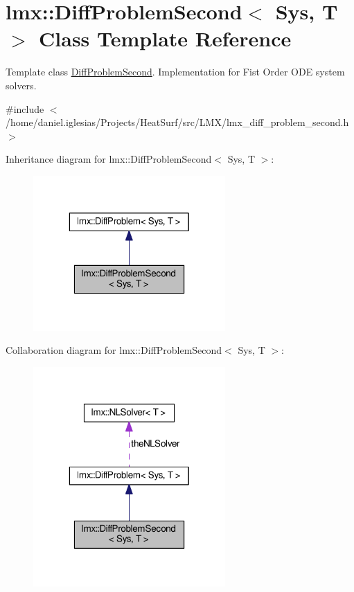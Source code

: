 \hypertarget{classlmx_1_1DiffProblemSecond}{\section{lmx\-:\-:Diff\-Problem\-Second$<$ Sys, T $>$ Class Template Reference}
\label{classlmx_1_1DiffProblemSecond}
}


Template class \hyperlink{classlmx_1_1DiffProblemSecond}{Diff\-Problem\-Second}. Implementation for Fist Order O\-D\-E system solvers.  




{\ttfamily \#include $<$/home/daniel.\-iglesias/\-Projects/\-Heat\-Surf/src/\-L\-M\-X/lmx\-\_\-diff\-\_\-problem\-\_\-second.\-h$>$}



Inheritance diagram for lmx\-:\-:Diff\-Problem\-Second$<$ Sys, T $>$\-:
\nopagebreak
\begin{figure}[H]
\begin{center}
\leavevmode
\includegraphics[width=208pt]{classlmx_1_1DiffProblemSecond__inherit__graph}
\end{center}
\end{figure}


Collaboration diagram for lmx\-:\-:Diff\-Problem\-Second$<$ Sys, T $>$\-:
\nopagebreak
\begin{figure}[H]
\begin{center}
\leavevmode
\includegraphics[width=208pt]{classlmx_1_1DiffProblemSecond__coll__graph}
\end{center}
\end{figure}
